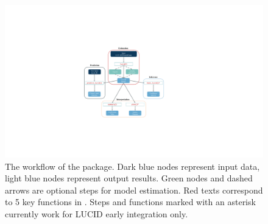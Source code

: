\begin{figure}[]
    \centering
    \includegraphics[scale = 0.5]{figures/fig2.pdf}
    \caption{The workflow of the  package. Dark blue nodes represent input data, light blue nodes represent output results. Green nodes and dashed arrows are optional steps for model estimation. Red texts correspond to 5 key functions in . Steps and functions marked with an asterisk currently work for LUCID early integration only.}
    \label{fig2}
\end{figure}

